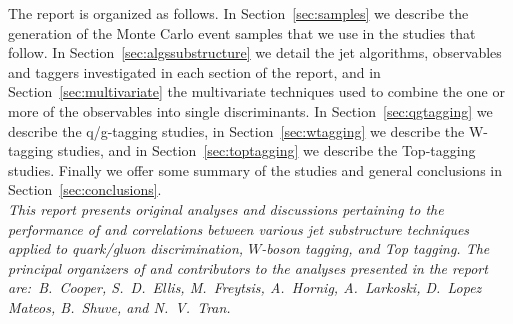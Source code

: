 The report is organized as follows. In Section~\ref{sec:samples} we describe the generation of the Monte Carlo event samples that we use in the studies that follow. In Section~\ref{sec:algssubstructure} we detail the jet algorithms, observables and taggers investigated in each section of the report, and in Section~\ref{sec:multivariate} the multivariate techniques used to combine the one or more of the observables into single discriminants. In Section~\ref{sec:qgtagging} we describe the q/g-tagging studies, in Section~\ref{sec:wtagging} we describe the W-tagging studies, and in Section~\ref{sec:toptagging} we describe the Top-tagging studies. Finally we offer some summary of the studies and general conclusions in Section~\ref{sec:conclusions}.\\

\emph{This report presents original analyses and discussions pertaining to the performance of and correlations between various jet substructure techniques applied to quark/gluon discrimination, $W$-boson tagging, and Top tagging. The principal organizers of and contributors to the analyses presented in the report are:~B.~Cooper, S.~D.~Ellis, M.~Freytsis, A.~Hornig, A.~Larkoski, D.~Lopez Mateos, B.~Shuve, and N.~V.~Tran.}